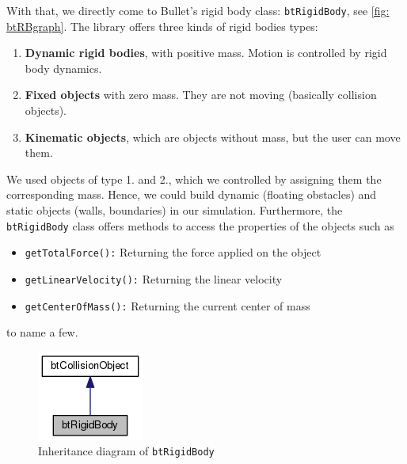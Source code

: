 With that, we directly come to Bullet's rigid body class: \verb+btRigidBody+, see \autoref{fig: btRBgraph}. The library offers three kinds of rigid bodies types:
\begin{enumerate}
\item \textbf{Dynamic rigid bodies}, with positive mass. Motion is controlled by rigid body dynamics.
\item \textbf{Fixed objects} with zero mass. They are not moving (basically collision objects).
\item \textbf{Kinematic objects}, which are objects without mass, but the user can move them.
\end{enumerate}
We used objects of type 1. and 2., which we controlled by assigning them the corresponding mass. Hence, we could build dynamic (floating obstacles) and static objects (walls, boundaries) in our simulation. Furthermore, the \texttt{btRigidBody} class offers methods to access the properties of the objects such as 
\begin{itemize}
\item \texttt{getTotalForce():} Returning the force applied on the object
\item \texttt{getLinearVelocity():} Returning the linear velocity
\item \texttt{getCenterOfMass():} Returning the current center of mass
\end{itemize}
to name a few. 

\begin{figure}
\centering
\includegraphics[scale=0.5]{img/RigidBodies/btRigidBodyGraph.png}
\caption{Inheritance diagram of \texttt{btRigidBody}}
\label{fig: btRBgraph}
\end{figure}

